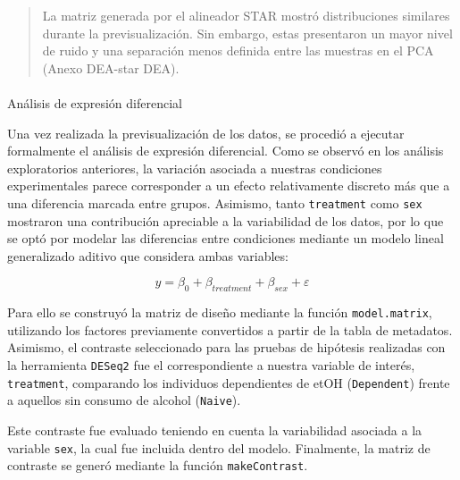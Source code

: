 \documentclass[
  10pt,
]{article}
\makeatletter
\let\oldparagraph\paragraph
\renewcommand{\paragraph}{
    \@ifstar
      \xxxParagraphStar
      \xxxParagraphNoStar
  }
\newcommand{\xxxParagraphStar}[1]{\oldparagraph*{#1}\mbox{}}
\newcommand{\xxxParagraphNoStar}[1]{\oldparagraph{#1}\mbox{}}
\makeatother
\begin{document}
\begin{quote}
La matriz generada por el alineador STAR mostró distribuciones similares
durante la previsualización. Sin embargo, estas presentaron un mayor
nivel de ruido y una separación menos definida entre las muestras en el
PCA (Anexo DEA-star DEA).
\end{quote}

\paragraph{Análisis de expresión
diferencial}\label{anuxe1lisis-de-expresiuxf3n-diferencial}

Una vez realizada la previsualización de los datos, se procedió a
ejecutar formalmente el análisis de expresión diferencial. Como se
observó en los análisis exploratorios anteriores, la variación asociada
a nuestras condiciones experimentales parece corresponder a un efecto
relativamente discreto más que a una diferencia marcada entre grupos.
Asimismo, tanto \texttt{treatment} como \texttt{sex} mostraron una
contribución apreciable a la variabilidad de los datos, por lo que se
optó por modelar las diferencias entre condiciones mediante un modelo
lineal generalizado aditivo que considera ambas variables:

\[
y = β_0 + β_{treatment} + β_{sex} + ε
\]

Para ello se construyó la matriz de diseño mediante la función
\texttt{model.matrix}, utilizando los factores previamente convertidos a
partir de la tabla de metadatos. Asimismo, el contraste seleccionado
para las pruebas de hipótesis realizadas con la herramienta
\texttt{DESeq2} fue el correspondiente a nuestra variable de interés,
\texttt{treatment}, comparando los individuos dependientes de etOH
(\texttt{Dependent}) frente a aquellos sin consumo de alcohol
(\texttt{Naive}).

Este contraste fue evaluado teniendo en cuenta la variabilidad asociada
a la variable \texttt{sex}, la cual fue incluida dentro del modelo.
Finalmente, la matriz de contraste se generó mediante la función
\texttt{makeContrast}.
\end{document}
